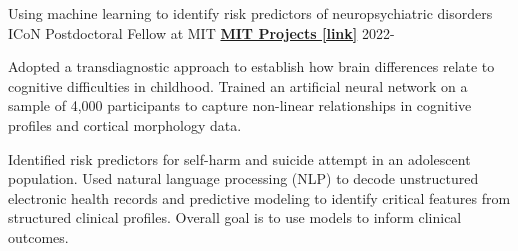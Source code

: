 

\begin{cventries}

  \cventry
    {Using machine learning to identify risk predictors of neuropsychiatric disorders}
    {ICoN Postdoctoral Fellow at MIT} %
    {\href{https://maedbhk.github.io/MIT-Projects/}{\textbf{MIT Projects [link]}}}
    {2022-} %
    {
      \begin{cvitems} %
		\item {Adopted a transdiagnostic approach to establish how brain differences relate to cognitive difficulties in childhood. Trained an artificial neural network on a sample of 4,000 participants to capture non-linear relationships in cognitive profiles and cortical morphology data.}
		\item {Identified risk predictors for self-harm and suicide attempt in an adolescent population. Used natural language processing (NLP) to decode unstructured electronic health records and predictive modeling to identify critical features from structured clinical profiles. Overall goal is to use models to inform clinical outcomes.}
		\end{cvitems}
    }



\end{cventries}
